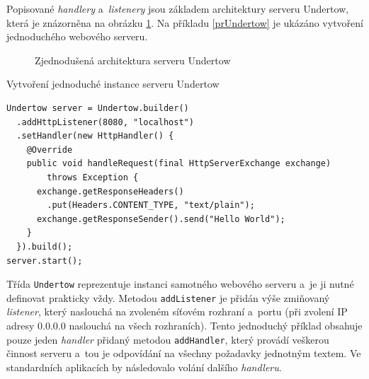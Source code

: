                 Popisované \emph{handlery} a~\emph{listenery} jsou základem architektury serveru Undertow, která je znázorněna
                na obrázku \ref{imgUndertowArchitecture}. 
                Na příkladu \ref{prUndertow} je ukázáno vytvoření jednoduchého webového serveru.

                \begin{figure}[ht]
                    \begin{center}
                        \caption{Zjednodušená architektura serveru Undertow}
                        \label{imgUndertowArchitecture}
                    \end{center}
                \end{figure}
  
\begin{priklad} \label{prUndertow} Vytvoření jednoduché instance serveru Undertow
\begin{verbatim}
Undertow server = Undertow.builder()
  .addHttpListener(8080, "localhost")
  .setHandler(new HttpHandler() {
    @Override
    public void handleRequest(final HttpServerExchange exchange) 
        throws Exception {
      exchange.getResponseHeaders()
        .put(Headers.CONTENT_TYPE, "text/plain");
      exchange.getResponseSender().send("Hello World");
    }
  }).build();
server.start();
\end{verbatim}
\end{priklad}
                
                Třída \texttt{Undertow} reprezentuje instanci samotného
                webového serveru a~je ji nutné definovat prakticky vždy. Metodou
                \texttt{addListener} je přidán výše zmiňovaný \emph{listener}, který
                naslouchá na zvoleném síťovém rozhraní a~portu (při zvolení IP adresy 0.0.0.0 naslouchá
                na všech rozhraních). Tento jednoduchý příklad obsahuje pouze jeden \emph{handler} 
                přidaný metodou \texttt{addHandler}, který
                provádí veškerou činnost serveru a~tou je odpovídání na všechny požadavky jednotným textem. 
                Ve standardních aplikacích by následovalo volání dalšího \emph{handleru}.

